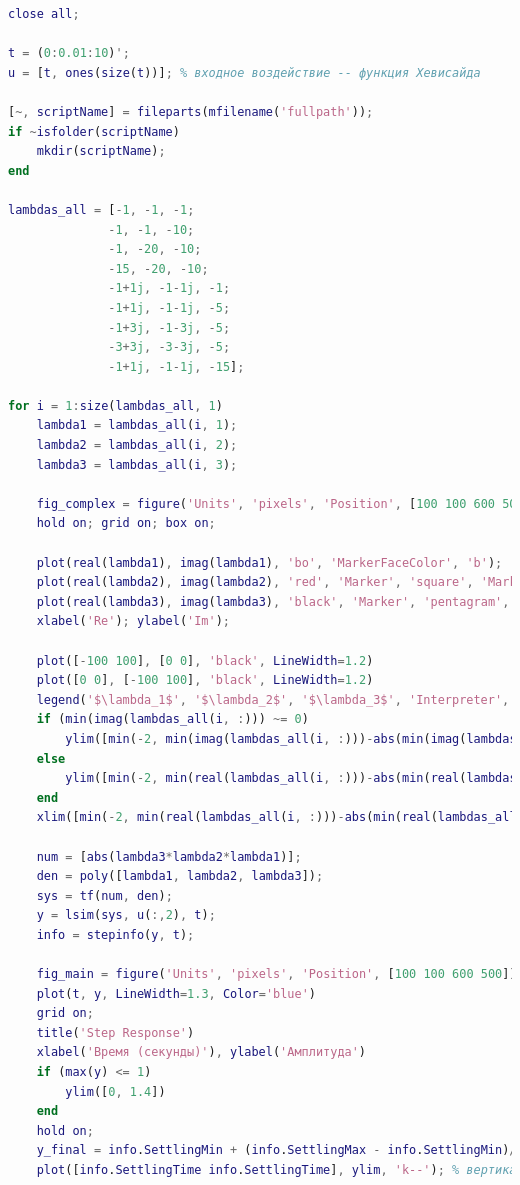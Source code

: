 \documentclass[a4paper]{article}
\begin{document}
\begin{lstlisting}[caption={Код для построения графиков для задания 2}, language=matlab]
% clear all;
close all;

t = (0:0.01:10)';
u = [t, ones(size(t))]; % входное воздействие -- функция Хевисайда

[~, scriptName] = fileparts(mfilename('fullpath'));
if ~isfolder(scriptName)
    mkdir(scriptName);
end

lambdas_all = [-1, -1, -1;
              -1, -1, -10;
              -1, -20, -10;
              -15, -20, -10;
              -1+1j, -1-1j, -1;
              -1+1j, -1-1j, -5;
              -1+3j, -1-3j, -5;
              -3+3j, -3-3j, -5;
              -1+1j, -1-1j, -15];

for i = 1:size(lambdas_all, 1)
    lambda1 = lambdas_all(i, 1);
    lambda2 = lambdas_all(i, 2);
    lambda3 = lambdas_all(i, 3);
    
    fig_complex = figure('Units', 'pixels', 'Position', [100 100 600 500]);
    hold on; grid on; box on;

    plot(real(lambda1), imag(lambda1), 'bo', 'MarkerFaceColor', 'b');
    plot(real(lambda2), imag(lambda2), 'red', 'Marker', 'square', 'MarkerFaceColor', 'red', 'LineStyle', 'none');
    plot(real(lambda3), imag(lambda3), 'black', 'Marker', 'pentagram', 'MarkerFaceColor', 'black', 'LineStyle', 'none');
    xlabel('Re'); ylabel('Im');

    plot([-100 100], [0 0], 'black', LineWidth=1.2)
    plot([0 0], [-100 100], 'black', LineWidth=1.2)
    legend('$\lambda_1$', '$\lambda_2$', '$\lambda_3$', 'Interpreter', 'latex', 'FontSize', 10);
    if (min(imag(lambdas_all(i, :))) ~= 0)
        ylim([min(-2, min(imag(lambdas_all(i, :)))-abs(min(imag(lambdas_all(i, :))))/4), max(2, max(imag(lambdas_all(i, :)))+abs(max(imag(lambdas_all(i, :))))/4)])
    else
        ylim([min(-2, min(real(lambdas_all(i, :)))-abs(min(real(lambdas_all(i, :)))/4)), max(2, max(real(lambdas_all(i, :)))+abs(max(real(lambdas_all(i, :))))/4)])
    end
    xlim([min(-2, min(real(lambdas_all(i, :)))-abs(min(real(lambdas_all(i, :))))/4), max(2, max(real(lambdas_all(i, :)))+abs(max(real(lambdas_all(i, :))))/4)])

    num = [abs(lambda3*lambda2*lambda1)];
    den = poly([lambda1, lambda2, lambda3]);
    sys = tf(num, den);
    y = lsim(sys, u(:,2), t);
    info = stepinfo(y, t);
    
    fig_main = figure('Units', 'pixels', 'Position', [100 100 600 500]);
    plot(t, y, LineWidth=1.3, Color='blue')
    grid on;
    title('Step Response')
    xlabel('Время (секунды)'), ylabel('Амплитуда')
    if (max(y) <= 1)
        ylim([0, 1.4])
    end
    hold on;
    y_final = info.SettlingMin + (info.SettlingMax - info.SettlingMin)/2; % среднее значение
    plot([info.SettlingTime info.SettlingTime], ylim, 'k--'); % вертикальная линия
    

\end{lstlisting}
\end{document}
